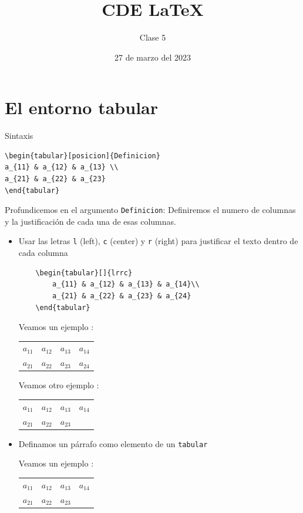 \documentclass{article}
\title{CDE \LaTeX}
\author{Clase 5}
\date{27 de marzo del 2023}
\begin{document}
\maketitle

\begin{abstract}
	\lipsum[2]
\end{abstract}

\section{El entorno tabular}
\noindent Sintaxis

\begin{verbatim}
\begin{tabular}[posicion]{Definicion}
a_{11} & a_{12} & a_{13} \\
a_{21} & a_{22} & a_{23}
\end{tabular}
\end{verbatim}

Profundicemos en el argumento \verb*|Definicion|:
Definiremos el numero de columnas y la justificación de cada una de esas columnas.
\begin{itemize}
\item Usar las letras \verb*|l| (left), \verb*|c| (center) y \verb*|r| (right) para justificar el texto dentro de cada columna
\begin{verbatim}
	\begin{tabular}[]{lrrc}
		a_{11} & a_{12} & a_{13} & a_{14}\\
		a_{21} & a_{22} & a_{23} & a_{24}
	\end{tabular}
\end{verbatim}

Veamos un ejemplo :

\begin{tabular}[]{lrrc}
	$a_{11}$ & $a_{12}$ & $a_{13}$ & $a_{14}$\\
	$a_{21}$ & $a_{22}$ & $a_{23}$ & $a_{24}$
\end{tabular}

Veamos otro ejemplo :

\begin{tabular}[]{lrrc}
	$a_{11}$ & $a_{12}$ & $a_{13}$ & $a_{14}$\\
	$a_{21}$ & $a_{22}$ & $a_{23}$ & \lipsum[2]
\end{tabular}


\item Definamos un párrafo como elemento de un \verb*|tabular|

Veamos un ejemplo : 

\begin{tabular}[]{lrrp{9cm}}
	$a_{11}$ & $a_{12}$ & $a_{13}$ & $a_{14}$\\
	$a_{21}$ & $a_{22}$ & $a_{23}$ & \lipsum[2]
\end{tabular}
\end{itemize}
\end{document}
